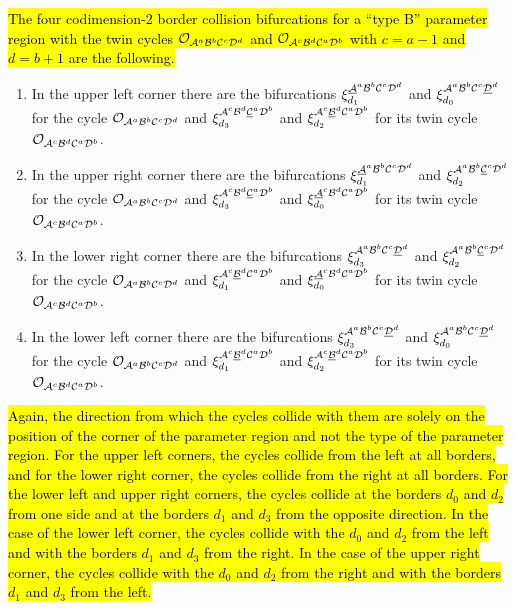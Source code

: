 \hl{
	The four codimension-2 border collision bifurcations for a ``type B'' parameter region with the twin cycles $\mathcal{O}_{\mathcal{A}^a\mathcal{B}^b\mathcal{C}^c\mathcal{D}^d}$ and $\mathcal{O}_{\mathcal{A}^c\mathcal{B}^d\mathcal{C}^a\mathcal{D}^b}$ with $c = a - 1$ and $d = b + 1$ are the following.
}

\begin{enumerate}
	\item In the upper left corner there are the bifurcations $\xi_{d_1}^{\underline{\mathcal{A}}^a\mathcal{B}^b\mathcal{C}^c\mathcal{D}^d}$ and $\xi_{d_0}^{\mathcal{A}^a\mathcal{B}^b\mathcal{C}^c\underline{\mathcal{D}}^d}$ for the cycle $\mathcal{O}_{\mathcal{A}^a\mathcal{B}^b\mathcal{C}^c\mathcal{D}^d}$ and $\xi_{d_3}^{\mathcal{A}^c\mathcal{B}^d\underline{\mathcal{C}}^a\mathcal{D}^b}$ and $\xi_{d_2}^{\mathcal{A}^c\underline{\mathcal{B}}^d\mathcal{C}^a\mathcal{D}^b}$ for its twin cycle $\mathcal{O}_{\mathcal{A}^c\mathcal{B}^d\mathcal{C}^a\mathcal{D}^b}$.
	\item In the upper right corner there are the bifurcations $\xi_{d_1}^{\underline{\mathcal{A}}^a\mathcal{B}^b\mathcal{C}^c\mathcal{D}^d}$ and $\xi_{d_2}^{\mathcal{A}^a\mathcal{B}^b\underline{\mathcal{C}}^c\mathcal{D}^d}$ for the cycle $\mathcal{O}_{\mathcal{A}^a\mathcal{B}^b\mathcal{C}^c\mathcal{D}^d}$ and $\xi_{d_3}^{\mathcal{A}^c\mathcal{B}^d\underline{\mathcal{C}}^a\mathcal{D}^b}$ and $\xi_{d_0}^{\underline{\mathcal{A}}^c\mathcal{B}^d\mathcal{C}^a\mathcal{D}^b}$ for its twin cycle $\mathcal{O}_{\mathcal{A}^c\mathcal{B}^d\mathcal{C}^a\mathcal{D}^b}$.
	\item In the lower right corner there are the bifurcations $\xi_{d_3}^{\mathcal{A}^a\mathcal{B}^b\mathcal{C}^c\underline{\mathcal{D}}^d}$ and $\xi_{d_2}^{\mathcal{A}^a\mathcal{B}^b\underline{\mathcal{C}}^c\mathcal{D}^d}$ for the cycle $\mathcal{O}_{\mathcal{A}^a\mathcal{B}^b\mathcal{C}^c\mathcal{D}^d}$ and $\xi_{d_1}^{\mathcal{A}^c\underline{\mathcal{B}}^d\mathcal{C}^a\mathcal{D}^b}$ and $\xi_{d_0}^{\underline{\mathcal{A}}^c\mathcal{B}^d\mathcal{C}^a\mathcal{D}^b}$ for its twin cycle $\mathcal{O}_{\mathcal{A}^c\mathcal{B}^d\mathcal{C}^a\mathcal{D}^b}$.
	\item In the lower left corner there are the bifurcations $\xi_{d_3}^{\mathcal{A}^a\mathcal{B}^b\mathcal{C}^c\underline{\mathcal{D}}^d}$ and $\xi_{d_0}^{\mathcal{A}^a\mathcal{B}^b\mathcal{C}^c\underline{\mathcal{D}}^d}$ for the cycle $\mathcal{O}_{\mathcal{A}^a\mathcal{B}^b\mathcal{C}^c\mathcal{D}^d}$ and $\xi_{d_1}^{\mathcal{A}^c\underline{\mathcal{B}}^d\mathcal{C}^a\mathcal{D}^b}$ and $\xi_{d_2}^{\mathcal{A}^c\underline{\mathcal{B}}^d\mathcal{C}^a\mathcal{D}^b}$ for its twin cycle $\mathcal{O}_{\mathcal{A}^c\mathcal{B}^d\mathcal{C}^a\mathcal{D}^b}$.
\end{enumerate}

\hl{
	Again, the direction from which the cycles collide with them are solely on the position of the corner of the parameter region and not the type of the parameter region.
	For the upper left corners, the cycles collide from the left at all borders, and for the lower right corner, the cycles collide from the right at all borders.
	For the lower left and upper right corners, the cycles collide at the borders $d_0$ and $d_2$ from one side and at the borders $d_1$ and $d_3$ from the opposite direction.
	In the case of the lower left corner, the cycles collide with the $d_0$ and $d_2$ from the left and with the borders $d_1$ and $d_3$ from the right.
	In the case of the upper right corner, the cycles collide with the $d_0$ and $d_2$ from the right and with the borders $d_1$ and $d_3$ from the left.
}

